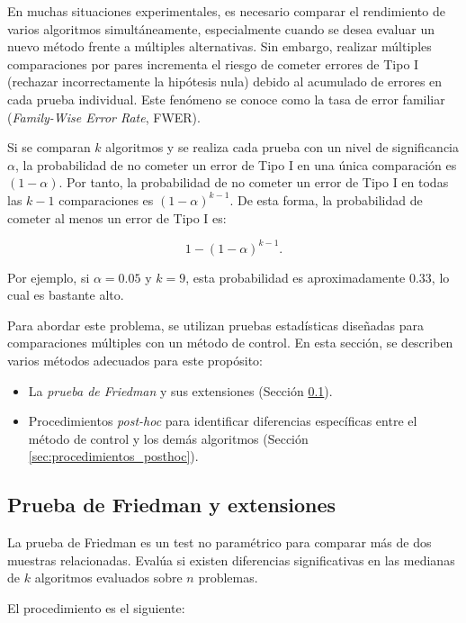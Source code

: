 En muchas situaciones experimentales, es necesario comparar el rendimiento de varios algoritmos simultáneamente, especialmente cuando se desea evaluar un nuevo método frente a múltiples alternativas. Sin embargo, realizar múltiples comparaciones por pares incrementa el riesgo de cometer errores de Tipo I (rechazar incorrectamente la hipótesis nula) debido al acumulado de errores en cada prueba individual. Este fenómeno se conoce como la tasa de error familiar (\textit{Family-Wise Error Rate}, FWER).

Si se comparan $k$ algoritmos y se realiza cada prueba con un nivel de significancia $\alpha$, la probabilidad de no cometer un error de Tipo I en una única comparación es $(1 - \alpha)$. Por tanto, la probabilidad de no cometer un error de Tipo I en todas las $k-1$ comparaciones es $(1 - \alpha)^{k - 1}$. De esta forma, la probabilidad de cometer al menos un error de Tipo I es:

\[
1 - (1 - \alpha)^{k - 1}.
\]

Por ejemplo, si $\alpha = 0.05$ y $k = 9$, esta probabilidad es aproximadamente $0.33$, lo cual es bastante alto.

Para abordar este problema, se utilizan pruebas estadísticas diseñadas para comparaciones múltiples con un método de control. En esta sección, se describen varios métodos adecuados para este propósito:

\begin{itemize}
    \item La \textit{prueba de Friedman} y sus extensiones (Sección \ref{sec:prueba_friedman}).
    \item Procedimientos \textit{post-hoc} para identificar diferencias específicas entre el método de control y los demás algoritmos (Sección \ref{sec:procedimientos_posthoc}).
\end{itemize}

\subsection{Prueba de Friedman y extensiones}
\label{sec:prueba_friedman}

La prueba de Friedman es un test no paramétrico para comparar más de dos muestras relacionadas. Evalúa si existen diferencias significativas en las medianas de $k$ algoritmos evaluados sobre $n$ problemas.

El procedimiento es el siguiente:


